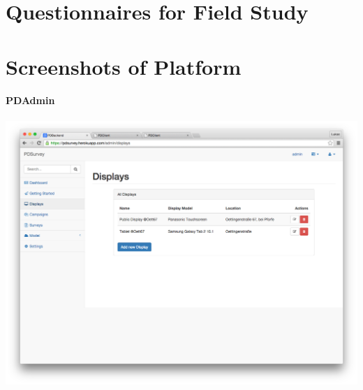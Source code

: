 \clearpage
\section{Questionnaires for Field Study}
\label{appendix:interviews}

  \label{appendix:interview-participant}
  

  \label{appendix:interview-passerby}
  

  \label{appendix:semi-structured-interview}
  



\clearpage
\section{Screenshots of Platform}




\paragraph{PDAdmin}


 \label{screenshot:pdadmin-displays}
    \begin{center}
        \includegraphics[width=\columnwidth]{img/screenshots/pdadmin/displays.png}
    \end{center}


